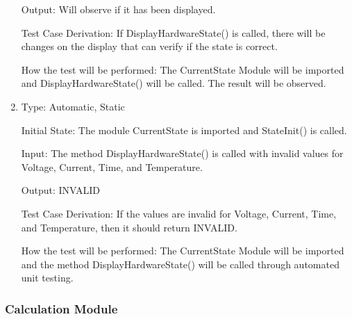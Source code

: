 \documentclass[12pt, titlepage]{article}
\begin{document}
\begin{enumerate}[{UT-CS}1.]
Output: Will observe if it has been displayed.

Test Case Derivation: If DisplayHardwareState() is called, there will be changes on the display that can verify if the state is correct.


How the test will be performed: The CurrentState Module will be imported and DisplayHardwareState() will be called. The result will be observed.

\item

Type: Automatic, Static
					
Initial State: The module CurrentState is imported and StateInit() is called.
					
Input: The method DisplayHardwareState() is called with invalid values for Voltage, Current, Time, and Temperature.
					
Output: INVALID

Test Case Derivation: If the values are invalid for Voltage, Current, Time, and Temperature, then it should return INVALID.

How the test will be performed: The CurrentState Module will be imported and the method DisplayHardwareState() will be called through automated unit testing.

    
\end{enumerate}


\subsubsection{Calculation Module }
\end{document}
